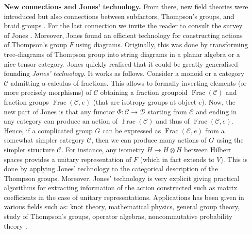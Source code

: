 \documentclass[a4paper, 12pt]{amsart}
\numberwithin{equation}{section}
\theoremstyle{definition}
\newcommand{\cC}{\mathcal C}
\newcommand{\cD}{\mathcal D}
\DeclareMathOperator{\Frac}{Frac}
\newcommand{\ot}{\otimes}
\begin{document}
{\bf New connections and Jones' technology.}
From there, new field theories were introduced but also connections between subfactors, Thompson's groups, and braid groups \cite{Jones17,Jones16}.
For the last connection we invite the reader to consult the survey of Jones \cite{Jones19-survey}.
Moreover, Jones found an efficient technology for constructing actions of Thompson's group $F$ using diagrams.
Originally, this was done by transforming tree-diagrams of Thompson group into string diagrams in a planar algebra or a nice tensor category. 
Jones quickly realised that it could be greatly generalised founding {\it Jones' technology}.
It works as follows.
Consider a monoid or a category $\cC$ admitting a calculus of fractions. 
This allows to formally inverting elements (or more precisely morphisms) of $\cC$ obtaining a fraction groupoid $\Frac(\cC)$ and fraction groups $\Frac(\cC,e)$ (that are isotropy groups at object $e$).
Now, the new part of Jones is that any functor $\Phi:\cC\to \cD$ starting from $\cC$ and ending in any category can produce an action of $\Frac(\cC)$ and thus of $\Frac(\cC,e)$.
Hence, if a complicated group $G$ can be expressed as $\Frac(\cC,e)$ from a somewhat simpler category $\cC$, then we can produce many actions of $G$ using the simpler structure $\cC$.
For instance, any isometry $H\to H\ot H$ between Hilbert spaces provides a unitary representation of $F$ (which in fact extends to $V$).
This is done by applying Jones' technology to the categorical description of the Thompson groups.
Moreover, Jones' technology is very explicit giving practical algorithms for extracting information of the action constructed such as matrix coefficients in the case of unitary representations.
Applications has been given in various fields such as: knot theory, mathematical physics, general group theory, study of Thompson's groups, operator algebras, noncommutative probability theory \cite{Jones19-survey,Aiello-Brothier-Conti21, Jones18-Hamiltonian, Brothier-Stottmeister19,Brothier-Stottmeister-P, Brothier19WP, Brothier-Jones19,Brothier-Jones19bis, Kostler-Krishnan-Wills20, Kostler-Krishnan22}. 
\end{document}
